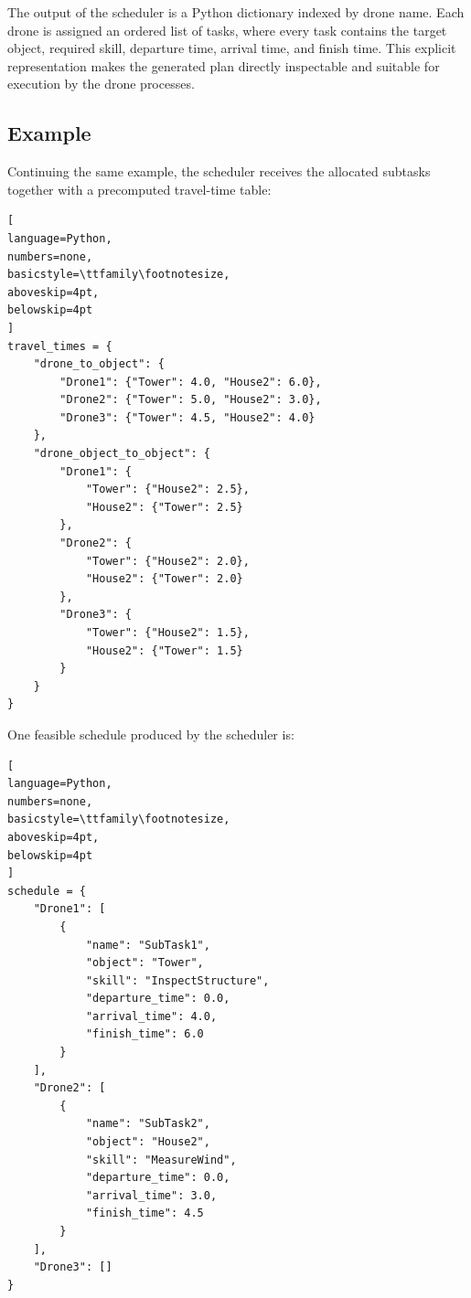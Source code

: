 The output of the scheduler is a Python dictionary indexed by drone name.
Each drone is assigned an ordered list of tasks, where every task contains the target object, 
required skill, departure time, arrival time, and finish time.
This explicit representation makes the generated plan directly inspectable and suitable for execution by the drone processes.

\subsection{Example}

Continuing the same example, the scheduler receives the allocated subtasks together with a precomputed travel-time table:

\noindent\begin{minipage}{\linewidth}
\begin{lstlisting}[
language=Python,
numbers=none,
basicstyle=\ttfamily\footnotesize,
aboveskip=4pt,
belowskip=4pt
]
travel_times = {
    "drone_to_object": {
        "Drone1": {"Tower": 4.0, "House2": 6.0},
        "Drone2": {"Tower": 5.0, "House2": 3.0},
        "Drone3": {"Tower": 4.5, "House2": 4.0}
    },
    "drone_object_to_object": {
        "Drone1": {
            "Tower": {"House2": 2.5},
            "House2": {"Tower": 2.5}
        },
        "Drone2": {
            "Tower": {"House2": 2.0},
            "House2": {"Tower": 2.0}
        },
        "Drone3": {
            "Tower": {"House2": 1.5},
            "House2": {"Tower": 1.5}
        }
    }
}
\end{lstlisting}
\end{minipage}

\noindent\begin{minipage}{\linewidth}
One feasible schedule produced by the scheduler is:

\begin{lstlisting}[
language=Python,
numbers=none,
basicstyle=\ttfamily\footnotesize,
aboveskip=4pt,
belowskip=4pt
]
schedule = {
    "Drone1": [
        {
            "name": "SubTask1",
            "object": "Tower",
            "skill": "InspectStructure",
            "departure_time": 0.0,
            "arrival_time": 4.0,
            "finish_time": 6.0
        }
    ],
    "Drone2": [
        {
            "name": "SubTask2",
            "object": "House2",
            "skill": "MeasureWind",
            "departure_time": 0.0,
            "arrival_time": 3.0,
            "finish_time": 4.5
        }
    ],
    "Drone3": []
}
\end{lstlisting}
\end{minipage}

